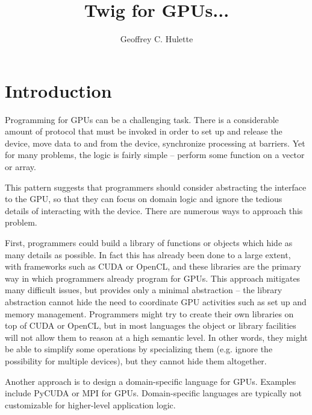\documentclass[11pt]{article}
\title{Twig for GPUs...}
\author{Geoffrey C. Hulette}
\begin{document}
\maketitle
\thispagestyle{empty}

\section{Introduction}

Programming for GPUs can be a challenging task. There is a considerable amount
of protocol that must be invoked in order to set up and release the device,
move data to and from the device, synchronize processing at barriers. Yet for
many problems, the logic is fairly simple -- perform some function on a vector
or array.

This pattern suggests that programmers should consider abstracting the
interface to the GPU, so that they can focus on domain logic and ignore the
tedious details of interacting with the device. There are numerous ways to
approach this problem.

First, programmers could build a library of functions or objects which hide as
many details as possible. In fact this has already been done to a large
extent, with frameworks such as CUDA or OpenCL, and these libraries are the
primary way in which programmers already program for GPUs. This approach
mitigates many difficult issues, but provides only a minimal abstraction --
the library abstraction cannot hide the need to coordinate GPU activities such
as set up and memory management. Programmers might try to create their own
libraries on top of CUDA or OpenCL, but in most languages the object or
library facilities will not allow them to reason at a high semantic level. In
other words, they might be able to simplify some operations by specializing
them (e.g. ignore the possibility for multiple devices), but they cannot hide
them altogether.

Another approach is to design a domain-specific language for GPUs. Examples
include PyCUDA or MPI for GPUs. Domain-specific languages are typically not
customizable for higher-level application logic.



% 

% 
% 
\end{document}
